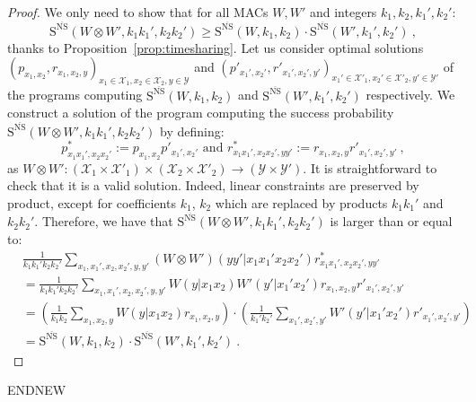   \begin{proof}
  We only need to show that for all MACs $W,W'$ and integers $k_1, k_2, k_1', k_2'$:
  \[ \mathrm{S}^{\overline{\mathrm{NS}}}(W \otimes W', k_1k_1', k_2k_2') \geq \mathrm{S}^{\overline{\mathrm{NS}}}(W, k_1, k_2) \cdot \mathrm{S}^{\overline{\mathrm{NS}}}(W', k_1', k_2') \ ,\]
  thanks to Proposition~\ref{prop:timesharing}. Let us consider optimal solutions $(p_{x_1,x_2}, r_{x_1,x_2,y})_{x_1 \in \mathcal{X}_1, x_2 \in \mathcal{X}_2, y \in \mathcal{Y}}$ and $(p'_{x_1',x_2'}, r'_{x_1',x_2',y'})_{x_1' \in \mathcal{X}'_1, x_2' \in \mathcal{X}'_2, y' \in \mathcal{Y}'}$ of the programs computing $\mathrm{S}^{\overline{\mathrm{NS}}}(W, k_1, k_2)$ and $\mathrm{S}^{\overline{\mathrm{NS}}}(W', k_1', k_2')$ respectively. We construct a solution of the program computing the success probability $\mathrm{S}^{\overline{\mathrm{NS}}}(W \otimes W', k_1k_1', k_2k_2')$ by defining:
  \[ p^*_{x_1x_1',x_2x_2'} := p_{x_1,x_2}p'_{x_1',x_2'} \text{ and } r^*_{x_1x_1',x_2x_2',yy'} := r_{x_1,x_2,y}r'_{x_1',x_2',y'} \ , \]
  as $W \otimes W' : (\mathcal{X}_1 \times \mathcal{X}'_1) \times (\mathcal{X}_2  \times \mathcal{X}'_2) \rightarrow (\mathcal{Y}  \times \mathcal{Y}')$. It is straightforward to check that it is a valid solution. Indeed, linear constraints are preserved by product, except for coefficients $k_1$, $k_2$ which are replaced by products $k_1k_1'$ and $k_2k_2'$. Therefore, we have that $\mathrm{S}^{\overline{\mathrm{NS}}}(W \otimes W', k_1k_1', k_2k_2')$ is larger than or equal to:
    \begin{equation}
      \begin{aligned}
        &\frac{1}{k_1k_1'k_2k_2'} \sum_{x_1,x_1',x_2,x_2',y,y'} \left(W \otimes W'\right)(yy'|x_1x_1'x_2x_2')r^*_{x_1x_1',x_2x_2',yy'}\\
        &= \frac{1}{k_1k_1'k_2k_2'} \sum_{x_1,x_1',x_2,x_2',y,y'} W(y|x_1x_2)W'(y'|x_1'x_2')r_{x_1,x_2,y}r'_{x_1',x_2',y'}\\
        &= \left(\frac{1}{k_1k_2} \sum_{x_1,x_2,y} W(y|x_1x_2)r_{x_1,x_2,y}\right)\cdot\left(\frac{1}{k_1'k_2'} \sum_{x_1',x_2',y'} W'(y'|x_1'x_2')r'_{x_1',x_2',y'}\right)\\
        &= \mathrm{S}^{\overline{\mathrm{NS}}}(W, k_1, k_2) \cdot \mathrm{S}^{\overline{\mathrm{NS}}}(W', k_1', k_2') \ .
      \end{aligned}
    \end{equation}   
    

  \end{proof}
ENDNEW

